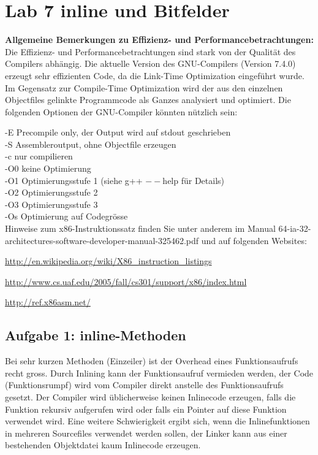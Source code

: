 \section{Lab 7 inline und Bitfelder}
\textbf{Allgemeine Bemerkungen zu Effizienz- und Performancebetrachtungen:}
Die Effizienz- und Performancebetrachtungen sind stark von der Qualität des Compilers abhängig. Die aktuelle Version des GNU-Compilers (Version 7.4.0) erzeugt sehr effizienten Code, da die Link-Time Optimization eingeführt wurde. Im Gegensatz zur Compile-Time Optimization wird der aus den einzelnen Objectfiles gelinkte Programmcode als Ganzes analysiert und optimiert.
Die folgenden Optionen der GNU-Compiler könnten nützlich sein:

\medskip
\noindent
-E \qquad Precompile only, der Output wird auf stdout geschrieben \\
-S \qquad Assembleroutput, ohne Objectfile erzeugen\\
-c \qquad nur compilieren\\
-O0 \quad keine Optimierung\\
-O1 \quad Optimierungsstufe 1 (siehe g++ $--$help für Details)\\
-O2 \quad Optimierungsstufe 2\\
-O3 \quad Optimierungsstufe 3\\
-Os \quad Optimierung auf Codegrösse\\

Hinweise zum x86-Instruktionssatz finden Sie unter anderem im Manual 64-ia-32-architectures-software-developer-manual-325462.pdf und auf folgenden Websites:

\url{http://en.wikipedia.org/wiki/X86_instruction_listings}

\url{http://www.cs.uaf.edu/2005/fall/cs301/support/x86/index.html}

\url{http://ref.x86asm.net/}

\subsection{Aufgabe 1: inline-Methoden}

Bei sehr kurzen Methoden (Einzeiler) ist der Overhead eines Funktionsaufrufs recht gross. Durch Inlining kann der Funktionsaufruf vermieden werden, der Code (Funktionsrumpf) wird vom Compiler direkt anstelle des Funktionsaufrufs gesetzt. Der Compiler wird üblicherweise keinen Inlinecode erzeugen, falls die Funktion rekursiv aufgerufen wird oder falls ein Pointer auf diese Funktion verwendet wird. Eine weitere Schwierigkeit ergibt sich, wenn die Inlinefunktionen in mehreren Sourcefiles verwendet werden sollen, der Linker kann aus einer bestehenden Objektdatei kaum Inlinecode erzeugen.

